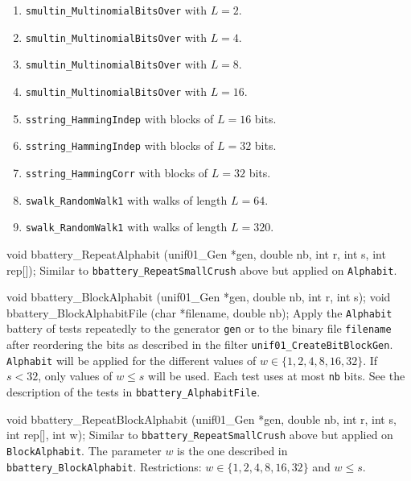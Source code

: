 \begin{enumerate}
  \item {\tt smultin\_MultinomialBitsOver} with $L=2$.
  \item {\tt smultin\_MultinomialBitsOver} with $L=4$.
  \item {\tt smultin\_MultinomialBitsOver} with $L=8$.
  \item {\tt smultin\_MultinomialBitsOver} with $L=16$.
  \item {\tt sstring\_HammingIndep} with blocks of $L = 16$ bits.
  \item {\tt sstring\_HammingIndep} with blocks of $L = 32$ bits.
  \item {\tt sstring\_HammingCorr} with blocks of $L = 32$ bits.
  \item {\tt swalk\_RandomWalk1} with walks of length $L = 64$.
  \item {\tt swalk\_RandomWalk1} with walks of length $L = 320$.
\end{enumerate}

\code

void bbattery_RepeatAlphabit (unif01_Gen *gen, double nb, int r, int s,
                              int rep[]);
\endcode
  \tab Similar to {\tt bbattery\_RepeatSmallCrush} above but applied on
  {\tt Alphabit}.
  \endtab
\code


void bbattery_BlockAlphabit (unif01_Gen *gen, double nb, int r, int s);
void bbattery_BlockAlphabitFile (char *filename, double nb);
\endcode
 \tab Apply the {\tt Alphabit} battery of tests repeatedly to the generator
  {\tt gen} or to the binary file {\tt filename} after reordering the bits
  as described in the filter {\tt unif01\_CreateBitBlockGen}.
  {\tt Alphabit} will be applied for the different values of
   $w \in \{1, 2, 4, 8, 16, 32\}$. If $s <32$, only values of $w \le s$ will
   be used. Each test uses at most {\tt nb} bits.
   See the description of the tests in {\tt bbattery\_AlphabitFile}. 
  \endtab
\code


void bbattery_RepeatBlockAlphabit (unif01_Gen *gen, double nb, int r, int s,
                                   int rep[], int w);
\endcode
  \tab Similar to {\tt bbattery\_RepeatSmallCrush} above but applied on
   {\tt BlockAlphabit}. The parameter $w$ is the one described in 
    {\tt bbattery\_BlockAlphabit}.  Restrictions:
   $w \in \{1, 2, 4, 8, 16, 32\}$ and $w \le s$. 
  \endtab




\code


